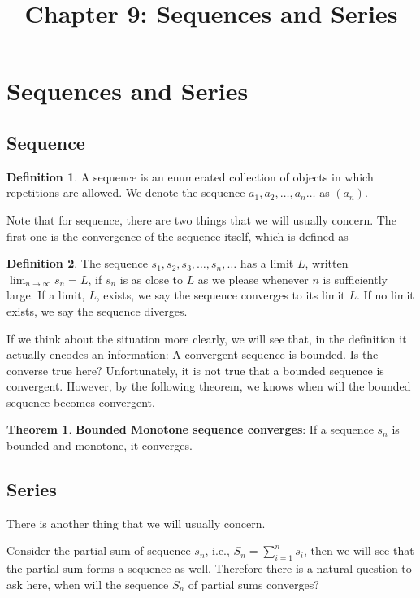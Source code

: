 \documentclass[12pt]{article}
\date{}
\title{Chapter 9: Sequences and Series}
\theoremstyle{definition}
\newtheorem{thm}{Theorem}[section]
\theoremstyle{definition}
\newtheorem{definition}{Definition}[section]
\theoremstyle{remark}
\theoremstyle{definition}
\theoremstyle{definition}
\theoremstyle{definition}
\begin{document}
\maketitle


\section{Sequences and Series}
\subsection{Sequence}
\begin{definition}
	A sequence is an enumerated collection of objects in which repetitions are allowed. We denote the sequence $a_1, a_2, \ldots, a_n \ldots $ as $(a_n)$.

\end{definition}	

Note that for sequence, there are two things that we will usually concern. The first one is the convergence of the sequence itself, which is defined as 

\begin{definition}
The sequence $s_1, s_2, s_3, \ldots , s_n, \ldots$ has a limit $L$, written $\lim_{n \to \infty}s_n = L$, if $s_n$ is as close to
$L$ as we please whenever $n$ is sufficiently large. If a limit, $L$, exists, we say the sequence
converges to its limit $L$. If no limit exists, we say the sequence diverges.
\end{definition}

If we think about the situation more clearly, we will see that, in the definition it actually encodes an information: A convergent sequence is bounded. Is the converse true here? Unfortunately, it is not true that a bounded sequence is convergent. However, by the following theorem, we knows when will the bounded sequence becomes convergent.

\begin{thm}
\textbf{Bounded Monotone sequence converges}: If a sequence $s_n$ is bounded and monotone, it converges.
\end{thm}

\newpage
\subsection{Series}
There is another thing that we will usually concern.

Consider the partial sum of sequence $s_n$, i.e., $S_n=\sum_{i=1}^{n}s_i$, then we will see that the partial sum forms a sequence as well. Therefore there is a natural question to ask here, when will the sequence $S_n$ of partial sums converges?
\end{document}
